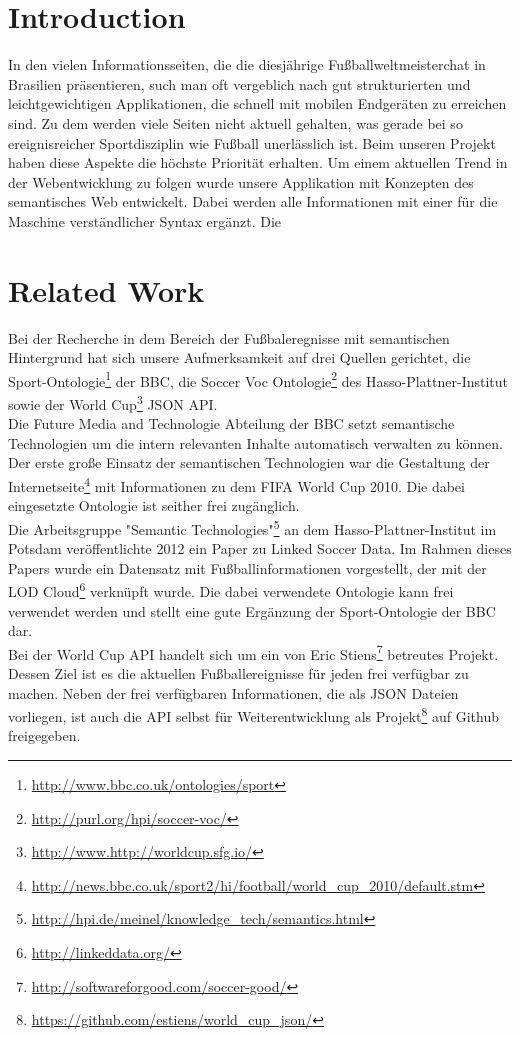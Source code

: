 \documentclass[runningheads,a4paper]{llncs}
\begin{document}
\section{Introduction}

In den vielen Informationsseiten, die die diesjährige Fußballweltmeisterchat in Brasilien präsentieren, such man oft vergeblich nach gut strukturierten und leichtgewichtigen Applikationen, die schnell mit mobilen Endgeräten zu erreichen sind. Zu dem werden viele Seiten nicht aktuell gehalten, was gerade bei so ereignisreicher Sportdisziplin wie Fußball unerlässlich ist. Beim unseren Projekt haben diese Aspekte die höchste Priorität erhalten. Um einem aktuellen Trend in der Webentwicklung zu folgen wurde unsere Applikation mit Konzepten des semantisches Web entwickelt. Dabei werden alle Informationen mit einer für die Maschine verständlicher Syntax ergänzt. Die           


\section{Related Work}

Bei der Recherche in dem Bereich der Fußbaleregnisse mit semantischen Hintergrund hat sich unsere Aufmerksamkeit auf drei Quellen gerichtet, die Sport-Ontologie\footnote{\url{http://www.bbc.co.uk/ontologies/sport}} der BBC, die Soccer Voc Ontologie\footnote{\url{http://purl.org/hpi/soccer-voc/}} des Hasso-Plattner-Institut sowie der World Cup\footnote{\url{http://www.http://worldcup.sfg.io/}} JSON API.\\ Die Future Media and Technologie Abteilung der BBC setzt semantische Technologien um die intern relevanten Inhalte automatisch verwalten zu können. Der erste große Einsatz der semantischen Technologien war die Gestaltung der Internetseite\footnote{\url{http://news.bbc.co.uk/sport2/hi/football/world_cup_2010/default.stm}} mit Informationen zu dem FIFA World Cup 2010. Die dabei eingesetzte Ontologie ist seither frei zugänglich. \\
Die Arbeitsgruppe "Semantic Technologies"\footnote{\url{http://hpi.de/meinel/knowledge_tech/semantics.html}} an dem Hasso-Plattner-Institut im Potsdam veröffentlichte 2012 ein Paper zu Linked Soccer Data\cite{url_lsd}. Im Rahmen dieses Papers wurde ein Datensatz mit Fußballinformationen vorgestellt, der mit der LOD Cloud\footnote{\url{http://linkeddata.org/}} verknüpft wurde. Die dabei verwendete Ontologie kann frei verwendet werden und stellt eine gute Ergänzung der Sport-Ontologie der BBC dar.\\
Bei der World Cup API handelt sich um ein von Eric Stiens\footnote{\url{http://softwareforgood.com/soccer-good/}} betreutes Projekt. Dessen Ziel ist es die aktuellen Fußballereignisse für jeden frei verfügbar zu machen. Neben der frei verfügbaren Informationen, die als JSON Dateien vorliegen, ist auch die API selbst für Weiterentwicklung als Projekt\footnote{\url{https://github.com/estiens/world_cup_json/}} auf Github freigegeben. 
\end{document}
